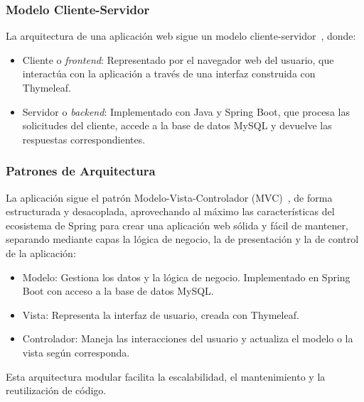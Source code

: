 \subsubsection{Modelo Cliente-Servidor}
La arquitectura de una aplicación web sigue un modelo cliente-servidor~\cite{client-server-model}, donde:
\begin{itemize}
\tightlist
\item
Cliente o \emph{frontend}: Representado por el navegador web del usuario, que interactúa con la aplicación a través de una interfaz construida con Thymeleaf.
\item
Servidor o \emph{backend}: Implementado con Java y Spring Boot, que procesa las solicitudes del cliente, accede a la base de datos MySQL y devuelve las respuestas correspondientes.
\end{itemize}

\subsubsection{Patrones de Arquitectura}
La aplicación sigue el patrón Modelo-Vista-Controlador (MVC)~\cite{modelo-vista-controrlador}, de forma estructurada y desacoplada, aprovechando al máximo las características del ecosistema de Spring para crear una aplicación web sólida y fácil de mantener, separando mediante capas la lógica de negocio, la de presentación y la de control de la aplicación:
\begin{itemize}
\tightlist
\item
Modelo: Gestiona los datos y la lógica de negocio. Implementado en Spring Boot con acceso a la base de datos MySQL.
\item
Vista: Representa la interfaz de usuario, creada con Thymeleaf.
\item
Controlador: Maneja las interacciones del usuario y actualiza el modelo o la vista según corresponda.
\end{itemize}
Esta arquitectura modular facilita la escalabilidad, el mantenimiento y la reutilización de código.
